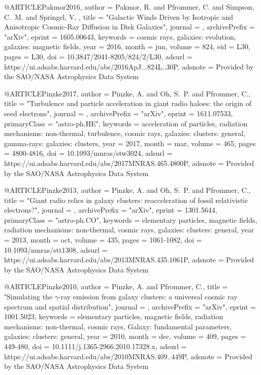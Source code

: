 \documentclass[useAMS,usenatbib]{mnras}
\begin{document}
{{{{{{@ARTICLE{Pakmor2016,
   author = {{Pakmor}, R. and {Pfrommer}, C. and {Simpson}, C.~M. and {Springel}, V.
	},
    title = "{Galactic Winds Driven by Isotropic and Anisotropic Cosmic-Ray Diffusion in Disk Galaxies}",
  journal = {\apjl},
archivePrefix = "arXiv",
   eprint = {1605.00643},
 keywords = {cosmic rays, galaxies: evolution, galaxies: magnetic fields},
     year = 2016,
    month = jun,
   volume = 824,
      eid = {L30},
    pages = {L30},
      doi = {10.3847/2041-8205/824/2/L30},
   adsurl = {https://ui.adsabs.harvard.edu/abs/2016ApJ...824L..30P},
  adsnote = {Provided by the SAO/NASA Astrophysics Data System}
}

@ARTICLE{Pinzke2017,
   author = {{Pinzke}, A. and {Oh}, S.~P. and {Pfrommer}, C.},
    title = "{Turbulence and particle acceleration in giant radio haloes: the origin of seed electrons}",
  journal = {\mnras},
archivePrefix = "arXiv",
   eprint = {1611.07533},
 primaryClass = "astro-ph.HE",
 keywords = {acceleration of particles, radiation mechanisms: non-thermal, turbulence, cosmic rays, galaxies: clusters: general, gamma-rays: galaxies: clusters},
     year = 2017,
    month = mar,
   volume = 465,
    pages = {4800-4816},
      doi = {10.1093/mnras/stw3024},
   adsurl = {https://ui.adsabs.harvard.edu/abs/2017MNRAS.465.4800P},
  adsnote = {Provided by the SAO/NASA Astrophysics Data System}
}

@ARTICLE{Pinzke2013,
   author = {{Pinzke}, A. and {Oh}, S.~P. and {Pfrommer}, C.},
    title = "{Giant radio relics in galaxy clusters: reacceleration of fossil relativistic electrons?}",
  journal = {\mnras},
archivePrefix = "arXiv",
   eprint = {1301.5644},
 primaryClass = "astro-ph.CO",
 keywords = {elementary particles, magnetic fields, radiation mechanisms: non-thermal, cosmic rays, galaxies: clusters: general},
     year = 2013,
    month = oct,
   volume = 435,
    pages = {1061-1082},
      doi = {10.1093/mnras/stt1308},
   adsurl = {https://ui.adsabs.harvard.edu/abs/2013MNRAS.435.1061P},
  adsnote = {Provided by the SAO/NASA Astrophysics Data System}
}

@ARTICLE{Pinzke2010,
   author = {{Pinzke}, A. and {Pfrommer}, C.},
    title = "{Simulating the {$\gamma$}-ray emission from galaxy clusters: a universal cosmic ray spectrum and spatial distribution}",
  journal = {\mnras},
archivePrefix = "arXiv",
   eprint = {1001.5023},
 keywords = {elementary particles, magnetic fields, radiation mechanisms: non-thermal, cosmic rays, Galaxy: fundamental parameters, galaxies: clusters: general},
     year = 2010,
    month = dec,
   volume = 409,
    pages = {449-480},
      doi = {10.1111/j.1365-2966.2010.17328.x},
   adsurl = {https://ui.adsabs.harvard.edu/abs/2010MNRAS.409..449P},
  adsnote = {Provided by the SAO/NASA Astrophysics Data System}
}

}}}}}}
\end{document}
